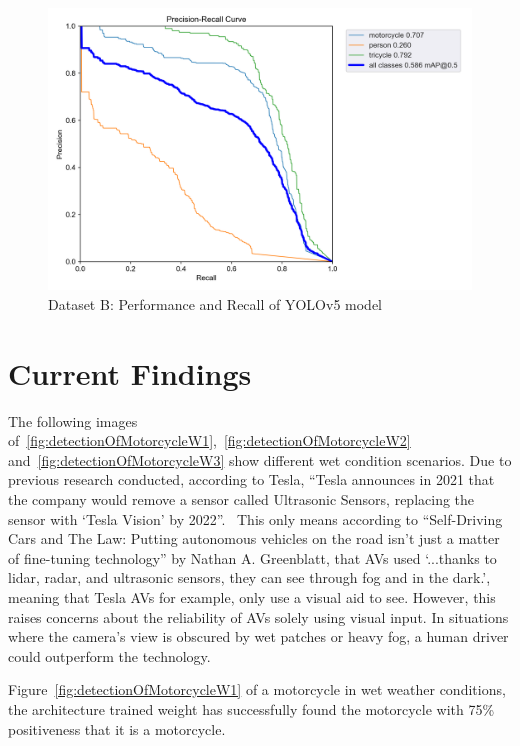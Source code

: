 \documentclass[conference]{IEEEtran}
\begin{document}
		\begin{figure}[h]
			\centering
			\includegraphics[width=\columnwidth]{Figures/dataset_b/PR_curve.png}
			\caption{Dataset B: Performance and Recall of YOLOv5 model}
			\label{fig:mtpDatasetYolov5LargeWeightPRCurve}
		\end{figure}

\section{Current Findings}
	The following images of~\ref{fig:detectionOfMotorcycleW1},~\ref{fig:detectionOfMotorcycleW2} and~\ref{fig:detectionOfMotorcycleW3} show different wet condition scenarios. Due to previous research conducted, according to Tesla, ``Tesla announces in 2021 that the company would remove a sensor called Ultrasonic Sensors, replacing the sensor with `Tesla Vision' by 2022''.~\cite{noauthor_tesla_nodate} This only means according to ``Self-Driving Cars and The Law: Putting autonomous vehicles on the road isn't just a matter of fine-tuning technology'' by Nathan A. Greenblatt, that AVs used `...thanks to lidar, radar, and ultrasonic sensors, they can see through fog and in the dark.', meaning that Tesla AVs for example, only use a visual aid to see. However, this raises concerns about the reliability of AVs solely using visual input. In situations where the camera's view is obscured by wet patches or heavy fog, a human driver could outperform the technology.

	Figure~\ref{fig:detectionOfMotorcycleW1} of a motorcycle in wet weather conditions, the architecture trained weight has successfully found the motorcycle with 75\% positiveness that it is a motorcycle.
\end{document}
